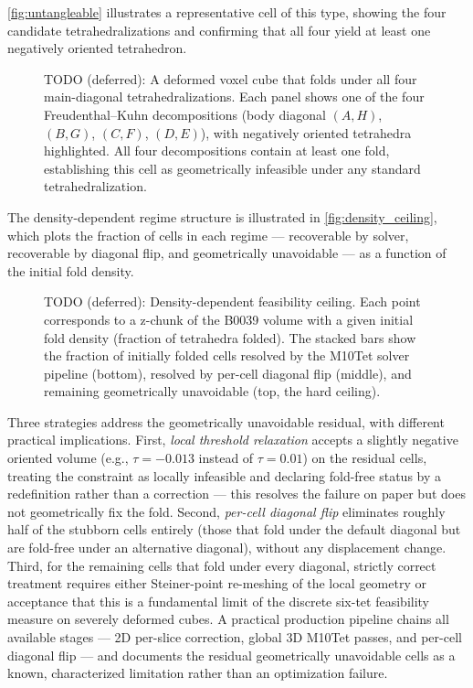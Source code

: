 \documentclass[lettersize,journal]{IEEEtran}
\begin{document}
\autoref{fig:untangleable} illustrates a representative cell of this type, showing the four candidate tetrahedralizations and confirming that all four yield at least one negatively oriented tetrahedron.

\begin{figure}[ht]\centering
\caption{TODO (deferred): A deformed voxel cube that folds under all four main-diagonal tetrahedralizations. Each panel shows one of the four Freudenthal--Kuhn decompositions (body diagonal $(A,H)$, $(B,G)$, $(C,F)$, $(D,E)$), with negatively oriented tetrahedra highlighted. All four decompositions contain at least one fold, establishing this cell as geometrically infeasible under any standard tetrahedralization.}
\label{fig:untangleable}
\end{figure}

The density-dependent regime structure is illustrated in \autoref{fig:density_ceiling}, which plots the fraction of cells in each regime --- recoverable by solver, recoverable by diagonal flip, and geometrically unavoidable --- as a function of the initial fold density.

\begin{figure}[ht]\centering
\caption{TODO (deferred): Density-dependent feasibility ceiling. Each point corresponds to a z-chunk of the B0039 volume with a given initial fold density (fraction of tetrahedra folded). The stacked bars show the fraction of initially folded cells resolved by the M10Tet solver pipeline (bottom), resolved by per-cell diagonal flip (middle), and remaining geometrically unavoidable (top, the hard ceiling).}
\label{fig:density_ceiling}
\end{figure}

Three strategies address the geometrically unavoidable residual, with different practical implications. First, \emph{local threshold relaxation} accepts a slightly negative oriented volume (e.g., $\tau = -0.013$ instead of $\tau = 0.01$) on the residual cells, treating the constraint as locally infeasible and declaring fold-free status by a redefinition rather than a correction --- this resolves the failure on paper but does not geometrically fix the fold. Second, \emph{per-cell diagonal flip} eliminates roughly half of the stubborn cells entirely (those that fold under the default diagonal but are fold-free under an alternative diagonal), without any displacement change. Third, for the remaining cells that fold under every diagonal, strictly correct treatment requires either Steiner-point re-meshing of the local geometry or acceptance that this is a fundamental limit of the discrete six-tet feasibility measure on severely deformed cubes. A practical production pipeline chains all available stages --- 2D per-slice correction, global 3D M10Tet passes, and per-cell diagonal flip --- and documents the residual geometrically unavoidable cells as a known, characterized limitation rather than an optimization failure.
\end{document}
